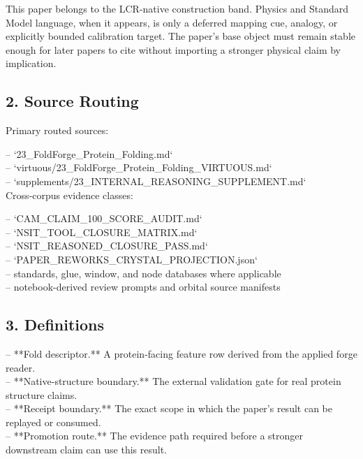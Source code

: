 \documentclass[11pt]{article}
\begin{document}
This paper belongs to the LCR-native construction band. Physics and Standard Model language, when it appears, is only a deferred mapping cue, analogy, or explicitly bounded calibration target. The paper's base object must remain stable enough for later papers to cite without importing a stronger physical claim by implication.

\subsection*{2. Source Routing}

Primary routed sources:

\noindent{}-- `23\_FoldForge\_Protein\_Folding.md`\\
\noindent{}-- `virtuous/23\_FoldForge\_Protein\_Folding\_VIRTUOUS.md`\\
\noindent{}-- `supplements/23\_INTERNAL\_REASONING\_SUPPLEMENT.md`\\

Cross-corpus evidence classes:

\noindent{}-- `CAM\_CLAIM\_100\_SCORE\_AUDIT.md`\\
\noindent{}-- `NSIT\_TOOL\_CLOSURE\_MATRIX.md`\\
\noindent{}-- `NSIT\_REASONED\_CLOSURE\_PASS.md`\\
\noindent{}-- `PAPER\_REWORKS\_CRYSTAL\_PROJECTION.json`\\
\noindent{}-- standards, glue, window, and node databases where applicable\\
\noindent{}-- notebook-derived review prompts and orbital source manifests\\

\subsection*{3. Definitions}

\noindent{}-- **Fold descriptor.** A protein-facing feature row derived from the applied forge reader.\\
\noindent{}-- **Native-structure boundary.** The external validation gate for real protein structure claims.\\
\noindent{}-- **Receipt boundary.** The exact scope in which the paper's result can be replayed or consumed.\\
\noindent{}-- **Promotion route.** The evidence path required before a stronger downstream claim can use this result.\\
\end{document}
